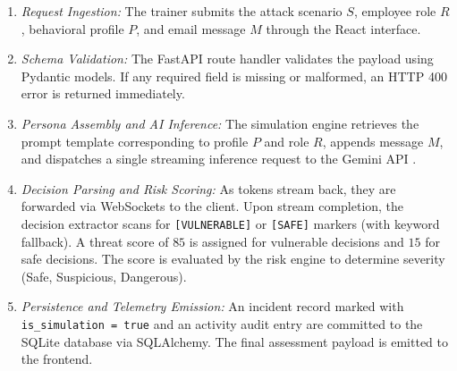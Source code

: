 \documentclass[conference,letterpaper]{IEEEtran}
\begin{document}
\begin{enumerate}
    \item \textit{Request Ingestion:} The trainer submits the attack scenario $S$, employee role $R$, behavioral profile $P$, and email message $M$ through the React interface.
    \item \textit{Schema Validation:} The FastAPI route handler validates the payload using Pydantic models. If any required field is missing or malformed, an HTTP 400 error is returned immediately.
    \item \textit{Persona Assembly and AI Inference:} The simulation engine retrieves the prompt template corresponding to profile $P$ and role $R$, appends message $M$, and dispatches a single streaming inference request to the Gemini API \cite{gemini2024}.
    \item \textit{Decision Parsing and Risk Scoring:} As tokens stream back, they are forwarded via WebSockets to the client. Upon stream completion, the decision extractor scans for \texttt{[VULNERABLE]} or \texttt{[SAFE]} markers (with keyword fallback). A threat score of $85$ is assigned for vulnerable decisions and $15$ for safe decisions. The score is evaluated by the risk engine to determine severity (Safe, Suspicious, Dangerous).
    \item \textit{Persistence and Telemetry Emission:} An incident record marked with \texttt{is\_simulation = true} and an activity audit entry are committed to the SQLite database via SQLAlchemy. The final assessment payload is emitted to the frontend.
\end{enumerate}
\end{document}

